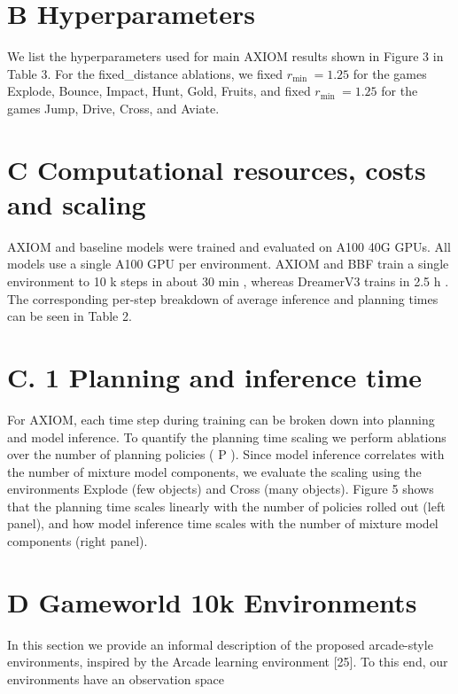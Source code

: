 \documentclass[10pt]{article}
\begin{document}
\section*{B Hyperparameters}
We list the hyperparameters used for main AXIOM results shown in Figure 3 in Table 3. For the fixed\_distance ablations, we fixed $r_{\text {min }}=1.25$ for the games Explode, Bounce, Impact, Hunt, Gold, Fruits, and fixed $r_{\text {min }}=1.25$ for the games Jump, Drive, Cross, and Aviate.

\section*{C Computational resources, costs and scaling}
AXIOM and baseline models were trained and evaluated on A100 40G GPUs. All models use a single A100 GPU per environment. AXIOM and BBF train a single environment to 10 k steps in about 30 min , whereas DreamerV3 trains in 2.5 h . The corresponding per-step breakdown of average inference and planning times can be seen in Table 2.

\section*{C. 1 Planning and inference time}
For AXIOM, each time step during training can be broken down into planning and model inference. To quantify the planning time scaling we perform ablations over the number of planning policies ( P ). Since model inference correlates with the number of mixture model components, we evaluate the scaling using the environments Explode (few objects) and Cross (many objects). Figure 5 shows that the planning time scales linearly with the number of policies rolled out (left panel), and how model inference time scales with the number of mixture model components (right panel).

\section*{D Gameworld 10k Environments}
In this section we provide an informal description of the proposed arcade-style environments, inspired by the Arcade learning environment [25]. To this end, our environments have an observation space
\end{document}
